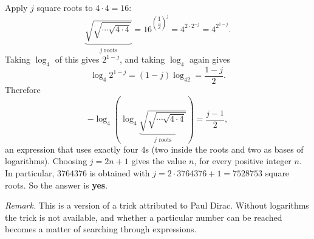 Apply $j$ square roots to $4\cdot4=16$:
\[\underbrace{\sqrt{\sqrt{\cdots\sqrt{4\cdot4}}}}_{j\text{ roots}}=16^{\left(\dfrac{1}{2}\right)^{j}}=4^{2\cdot2^{-j}}=4^{2^{1-j}} .\]
Taking $\log_4$ of this gives $2^{1-j}$, and taking $\log_4$ again gives
\[\log_4 2^{1-j}=(1-j)\log_42=\dfrac{1-j}{2}.\]
Therefore
\[-\log_4\left(\log_4\underbrace{\sqrt{\sqrt{\cdots\sqrt{4\cdot4}}}}_{j\text{ roots}}\right)=\dfrac{j-1}{2},\]
an expression that uses exactly four $4$s (two inside the roots and two as bases of logarithms). Choosing $j=2n+1$ gives the value $n$, for every positive integer $n$. In particular, $3764376$ is obtained with $j=2\cdot3764376+1=7528753$ square roots. So the answer is \textbf{yes}.

\emph{Remark.} This is a version of a trick attributed to Paul Dirac. Without logarithms the trick is not available, and whether a particular number can be reached becomes a matter of searching through expressions.
